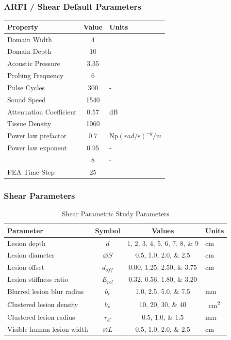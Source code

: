 \documentclass{beamer}
\begin{document}
		\begin{frame}[label=arfiDefaultParams]
			\frametitle{ARFI / Shear Default Parameters}
			\centering
			\scriptsize
			\begin{table}
				\begin{tabular}{lSs[table-unit-alignment = left]}
					\toprule
					Property & {Value} & Units \\
					\midrule
					Domain Width & 4 & \cm \\
					Domain Depth & 10 & \cm \\
					Acoustic Pressure & 3.35 & \MPa \\
					Probing Frequency & 6 & \MHz \\
					Pulse Cycles & 300 & - \\
					Sound Speed & 1540 & \metre\per\second \\
					Attenuation Coefficient & 0.57 & {dB}\per\MHz\cm \\
					Tissue Density & 1060 & \kg\per\m\cubed \\
					Power law prefactor & 0.7 & $\si{\neper} \left(\si{rad\per\s}\right)^{-y} \si{\per\m}$ \\
					Power law exponent & 0.95 & - \\
					 & 8 & - \\
					FEA Time-Step & 25 & \ns \\
					\bottomrule
				\end{tabular}
			\end{table}
		\end{frame}

		\begin{frame}[label=shearParameters]
			\frametitle{Shear Parameters}
			\centering
			\scriptsize

			\begin{table}
				\caption{Shear Parametric Study Parameters}
				\begin{tabular}{lccs[table-unit-alignment = left]}
					\toprule
					Parameter & Symbol & Values & Units \\
					\midrule
					Lesion depth & $d$ & \numlist{1;2;3;4;5;6;7;8;9} & \si{\cm} \\
					Lesion diameter & $\diameter S$ & \numlist{0.5;1.0;2.0;2.5} & \si{\cm} \\
					Lesion offset & $d_{off}$ & \numlist{0.00;1.25;2.50;3.75} & \si{\cm} \\
					Lesion stiffness ratio & $E_{rel}$ & \numlist{0.32;0.56;1.80;3.20} & \\
					Blurred lesion blur radius & $b_r$ & \numlist{1.0;2.5;5.0;7.5} & \si{\mm} \\
					Clustered lesion density & $b_\rho$ & \numlist{10;20;30;40} & \si{\per\cm\squared} \\
					Clustered lesion radius & $r_{bl}$ & \numlist{0.5;1.0;1.5} & \si{\mm} \\
					Visible human lesion width & $\diameter L$ & \numlist{0.5;1.0;2.0;2.5} & \si{\cm} \\
					\bottomrule
				\end{tabular}
			\end{table}
		\end{frame}
\end{document}
